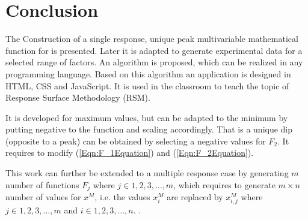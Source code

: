 \documentclass[twocolumn]{svjour3}          %
\begin{document}
\section{Conclusion}
\label{Sec:Conclusion}
The Construction of a single response, unique peak multivariable mathematical function for is presented. Later it is adapted to generate experimental data for a selected range of factors. An algorithm is proposed, which can be realized in any programming language. Based on this algorithm an application is designed in HTML, CSS and JavaScript. It is used in the classroom to teach the topic of Response Surface Methodology (RSM).
\par
It is developed for maximum values, but can be adapted to the minimum by putting negative to the function and scaling accordingly. That is a unique dip (opposite to a peak) can be obtained by selecting a negative values for $F_2$. It requires to modify (\ref{Eqn:F_1Equation}) and (\ref{Eqn:F_2Equation}).
\par
This work can further be extended to a multiple response case by generating $m$ number of functions $F_j$ where $j\in {1,2,3, \dots, m}$, which requires to generate $m\times n$ number of values for $x^M$, i.e. the values $x_{i}^M$ are replaced by $x_{i,j}^M$ where $j\in {1,2,3, \dots, m}$ and $i\in {1,2,3, \dots, n}$. .



\end{document}
